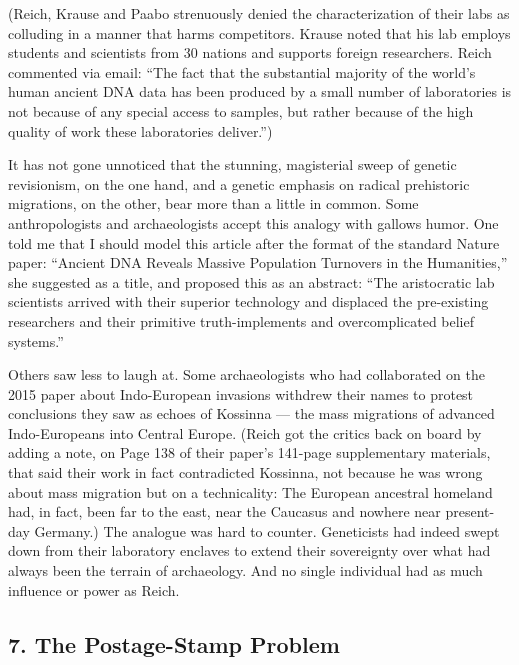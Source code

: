 (Reich, Krause and Paabo strenuously denied the characterization of
their labs as colluding in a manner that harms competitors. Krause noted
that his lab employs students and scientists from 30 nations and
supports foreign researchers. Reich commented via email: ``The fact that
the substantial majority of the world's human ancient DNA data has been
produced by a small number of laboratories is not because of any special
access to samples, but rather because of the high quality of work these
laboratories deliver.'')

It has not gone unnoticed that the stunning, magisterial sweep of
genetic revisionism, on the one hand, and a genetic emphasis on radical
prehistoric migrations, on the other, bear more than a little in common.
Some anthropologists and archaeologists accept this analogy with gallows
humor. One told me that I should model this article after the format of
the standard Nature paper: ``Ancient DNA Reveals Massive Population
Turnovers in the Humanities,'' she suggested as a title, and proposed
this as an abstract: ``The aristocratic lab scientists arrived with
their superior technology and displaced the pre-existing researchers and
their primitive truth-implements and overcomplicated belief systems.''

Others saw less to laugh at. Some archaeologists who had collaborated on
the 2015 paper about Indo-European invasions withdrew their names to
protest conclusions they saw as echoes of Kossinna --- the mass
migrations of advanced Indo-Europeans into Central Europe. (Reich got
the critics back on board by adding a note, on Page 138 of their paper's
141-page supplementary materials, that said their work in fact
contradicted Kossinna, not because he was wrong about mass migration but
on a technicality: The European ancestral homeland had, in fact, been
far to the east, near the Caucasus and nowhere near present-day
Germany.) The analogue was hard to counter. Geneticists had indeed swept
down from their laboratory enclaves to extend their sovereignty over
what had always been the terrain of archaeology. And no single
individual had as much influence or power as Reich.

\hypertarget{7-the-postage-stamp-problem}{%
\subsection{\texorpdfstring{\textbf{7. The Postage-Stamp
Problem}}{7. The Postage-Stamp Problem}}\label{7-the-postage-stamp-problem}}


